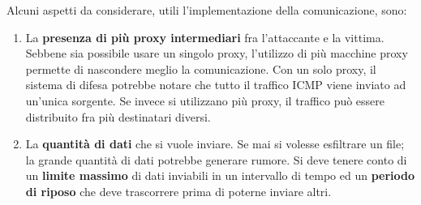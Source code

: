 \vspace{2ex} 
Alcuni aspetti da considerare, utili l'implementazione della comunicazione, sono: 
\begin{enumerate}
    \item La \textbf{presenza di più proxy intermediari} fra l'attaccante e la vittima. 
    Sebbene sia possibile usare un singolo proxy, l'utilizzo di più macchine 
    proxy permette di nascondere meglio la comunicazione. 
    \vspace{1ex} \newline
    Con un solo proxy, il sistema di difesa potrebbe notare che tutto 
    il traffico ICMP viene inviato ad un'unica sorgente. 
    Se invece si utilizzano più proxy, il traffico può essere distribuito fra più destinatari diversi. 
    \item La \textbf{quantità di dati} che si vuole inviare. %
    Se mai si volesse esfiltrare un file; la grande quantità di dati potrebbe generare rumore. 
    \vspace{1ex} \newline 
    Si deve tenere conto di un \textbf{limite massimo} di dati inviabili in un intervallo di tempo ed 
    un \textbf{periodo di riposo} che deve trascorrere prima di poterne inviare altri.

\end{enumerate}
